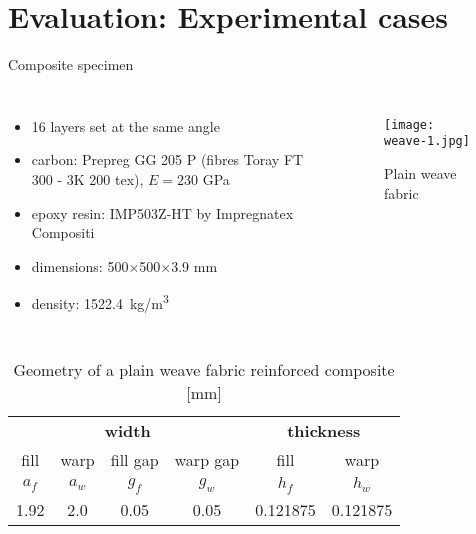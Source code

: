 \documentclass[10pt,aspectratio=169,dvipsnames]{beamer} %
\newcounter{angle}
\begin{document}
	\section{Evaluation: Experimental cases}
	\begin{frame}[t]{Composite specimen}
		\begin{columns}[T]
			{\small
				\begin{itemize}
					\item 16 layers set at the same angle \\
					\item carbon: Prepreg GG 205  P (fibres Toray FT 300 - 3K 200 tex), $E=230$ GPa
					\item epoxy resin: IMP503Z-HT by Impregnatex Compositi 
					\item dimensions: 500$\times$500$\times$3.9 mm\\
					\item density: 1522.4~kg/m\textsuperscript{3}
				\end{itemize}
			}
			\begin{figure}
				\texttt{[image: weave-1.jpg]}
				\caption{Plain weave fabric}
			\end{figure}
		\end{columns}
		\begin{table}[h]
			\renewcommand{\arraystretch}{1.1}
			\centering \footnotesize
			\caption{Geometry of a plain weave fabric reinforced composite [mm]}
			\begin{tabular}{cccccc} 
				\toprule[1.5pt]
				\multicolumn{4}{c}{\textbf{width} }	& \multicolumn{2}{c}{\textbf{thickness} }  \\ 
				\cmidrule(lr){1-4} \cmidrule(lr){5-6} 
				fill & warp & fill gap& warp gap& fill & warp\\
				$a_f$ &$a_w$& $g_f$  & $g_w$  & $h_f$& $h_w$ \\ 
				\cmidrule(lr){1-2} \cmidrule(lr){3-4} \cmidrule(lr){5-6}
				1.92 &2.0& 0.05& 0.05 & 0.121875 & 0.121875 \\
				\bottomrule[1.5pt] 
			\end{tabular} 
		\label{tab:weave_geo}
		\end{table}
	\end{frame}
\end{document}
